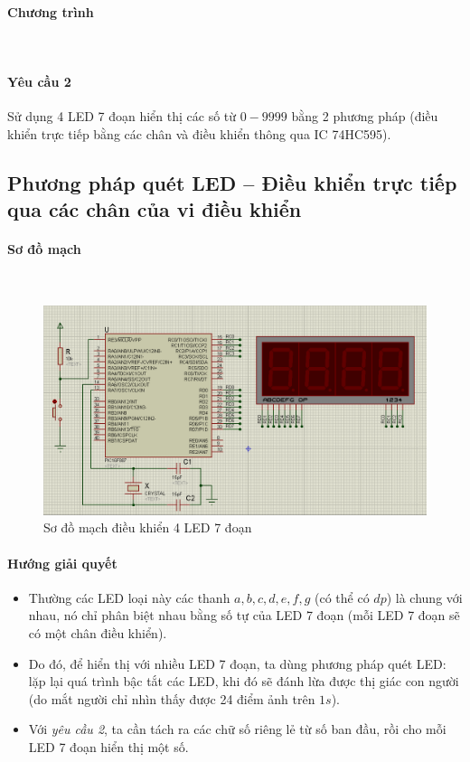 \paragraph{Chương trình}{~\\}

\paragraph{Yêu cầu 2}Sử dụng 4 LED 7 đoạn hiển thị các số từ $0 - 9999$ bằng 2 phương pháp (điều khiển trực tiếp bằng các chân và điều khiển thông qua IC 74HC595).
\tocless \subsection{Phương pháp quét LED -- Điều khiển trực tiếp qua các chân của vi điều khiển}
\paragraph{Sơ đồ mạch}{~\\}
\begin{figure}[!h]
\begin{center}
\includegraphics[scale=.5]{phu-luc/image/bai-2-phu-luc-4-led-7-seg}
\end{center}
\caption{Sơ đồ mạch điều khiển 4 LED 7 đoạn}
\end{figure}
\paragraph{Hướng giải quyết}
\begin{itemize}
\item Thường các LED loại này các thanh $a,b,c,d,e,f,g$ (có thể có $dp$) là chung với nhau, nó chỉ phân biệt nhau bằng số tự của LED 7 đoạn (mỗi LED 7 đoạn sẽ có một chân điều khiển).
\item Do đó, để hiển thị với nhiều LED 7 đoạn, ta dùng phương pháp quét LED: lặp lại quá trình bậc tắt các LED, khi đó sẽ đánh lừa được thị giác con người (do mắt người chỉ nhìn thấy được 24 điểm ảnh trên $1s$).
\item Với \textit{yêu cầu 2}, ta cần tách ra các chữ số riêng lẻ từ số ban đầu, rồi cho mỗi LED 7 đoạn hiển thị một số.
\end{itemize}
